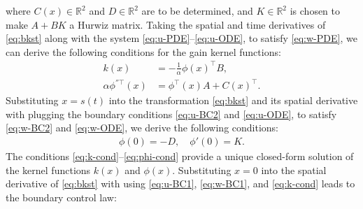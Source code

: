 \documentclass[letterpaper, 10 pt, conference]{cls/ieeeconf}
\theoremstyle{definition}
\newcommand{\bbR}{\mathbb{R}}
\begin{document}
where $C(x) \in \bbR^2$ and $D \in \bbR^2$ are to be determined, and $K \in \bbR^2$ is chosen to make $A + BK$ a Hurwiz matrix. 
Taking the spatial and time derivatives of \eqref{eq:bkst} along with the system \eqref{eq:u-PDE}--\eqref{eq:u-ODE}, to satisfy \eqref{eq:w-PDE}, we can derive the following conditions for the gain kernel functions: 
\begin{align} \label{eq:k-cond}
    k(x) &= - \frac{1}{\alpha} \phi(x)^\top B, \\
    \alpha \phi^{''\top}(x) &=  \phi^\top(x) A + C(x)^\top . \label{eq:phi-ODE}
\end{align}
Substituting $x = s(t)$ into the transformation \eqref{eq:bkst} and its spatial derivative with plugging the boundary conditions \eqref{eq:u-BC2} and \eqref{eq:u-ODE}, to satisfy \eqref{eq:w-BC2} and \eqref{eq:w-ODE}, we derive the following conditions: 
\begin{align} \label{eq:phi-cond}
    \phi(0) = - D, \quad \phi'(0) = K.   
\end{align}
The conditions \eqref{eq:k-cond}--\eqref{eq:phi-cond} provide a unique closed-form solution of the kernel functions $k(x)$ and $\phi(x)$. Substituting $x = 0$ into the spatial derivative of \eqref{eq:bkst} with using \eqref{eq:u-BC1}, \eqref{eq:w-BC1}, and \eqref{eq:k-cond} leads to the boundary control law: 
\end{document}
